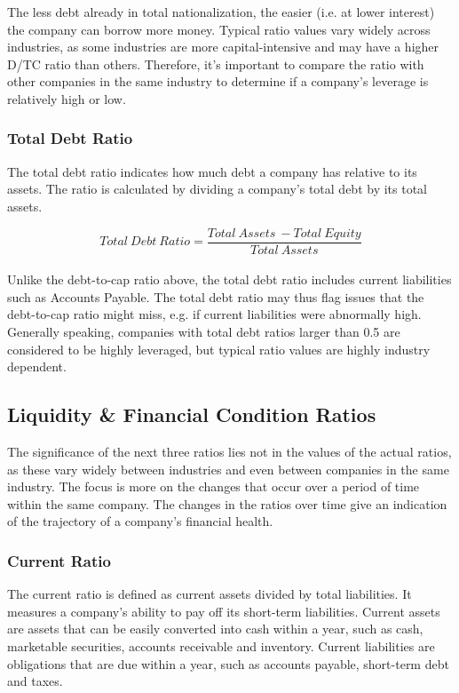 \documentclass{article}
\begin{document}
The less debt already in total nationalization, the easier (i.e. at lower interest) the company can borrow more money. Typical ratio values vary widely across industries, as some industries are more capital-intensive and may have a higher D/TC ratio than others. Therefore, it's important to compare the ratio with other companies in the same industry to determine if a company's leverage is relatively high or low.

\subsubsection{Total Debt Ratio}
The total debt ratio indicates how much debt a company has relative to its assets. The ratio is calculated by dividing a company's total debt by its total assets. 

 \begin{equation}
    Total\: Debt\: Ratio = \frac{Total\: Assets\: - Total\: Equity}{Total\: Assets}
\end{equation}\\

Unlike the debt-to-cap ratio above, the total debt ratio includes current liabilities such as Accounts Payable. The total debt ratio may thus flag issues that the debt-to-cap ratio might miss, e.g. if current liabilities were abnormally high. Generally speaking, companies with total debt ratios larger than 0.5 are considered to be highly leveraged, but typical ratio values are highly industry dependent. 

\subsection{Liquidity \& Financial Condition Ratios}
The significance of the next three ratios lies not in the values of the actual ratios, as these vary widely between industries and even between companies in the same industry. The focus is more on the changes that occur over a period of time within the same company. The changes in the ratios over time give an indication of the trajectory of a company's financial health. 

\subsubsection{Current Ratio}
The current ratio is defined as current assets divided by total liabilities. It measures a company's ability to pay off its short-term liabilities. Current assets are assets that can be easily converted into cash within a year, such as cash, marketable securities, accounts receivable and inventory. Current liabilities are obligations that are due within a year, such as accounts payable, short-term debt and taxes.
\end{document}

